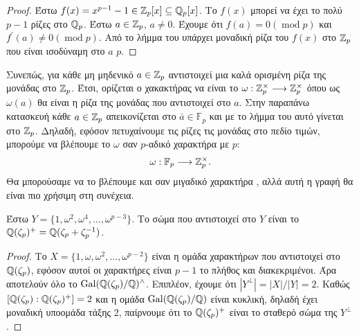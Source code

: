 \begin{proof}
	Έστω $f(x) = x^{p-1} -1 \in \mathbb{Z}_p[x] \subseteq \mathbb{Q}_p[x]$. Το $f(x)$ μπορεί να έχει το πολύ $p-1$ ρίζες στο $\mathbb{Q}_p$. Έστω $a \in \mathbb{Z}_p$, $a\neq 0$. 
	Έχουμε ότι $f(a) = 0 (\operatorname{mod} p)$ και $f^{\prime}(a) \neq 0(\operatorname{mod}p)$. Από το λήμμα του  υπάρχει μοναδική ρίζα του $f(x)$ στο $\mathbb{Z}_p$ που είναι ισοδύναμη στο $a$  $p$. 
\end{proof}


\noindent Συνεπώς, για κάθε μη μηδενικό $a\in\mathbb{Z}_p$ αντιστοιχεί μια καλά ορισμένη ρίζα της μονάδας στο $\mathbb{Z}_p$. Έτσι, ορίζεται ο χακακτήρας  
να είναι το $\omega:\mathbb{Z}_p^\times \longrightarrow \mathbb{Z}_p^\times$ όπου ως $\omega(a)$ θα είναι η ρίζα της μονάδας που αντιστοιχεί στο $a$. Στην παραπάνω 
κατασκευή κάθε $a\in \mathbb{Z}_p$ απεικονίζεται στο $\bar{a} \in \mathbb{F}_p$ και με το λήμμα του  αυτό γίνεται  στο $\mathbb{Z}_p$. Δηλαδή, εφόσον πετυχαίνουμε τις ρίζες τις μονάδας στο πεδίο τιμών, μπορούμε να βλέπουμε το $\omega$ σαν $p$-αδικό χαρακτήρα  με  $p$:
$$\omega: \mathbb{F}_p \longrightarrow \mathbb{Z}_p^\times .$$
Θα μπορούσαμε να το βλέπουμε και σαν μιγαδικό χαρακτήρα , αλλά αυτή η γραφή θα είναι πιο χρήσιμη στη συνέχεια.

\begin{prop} Έστω $Y = \{1,\omega^2,\omega^4,\ldots,\omega^{p-3}\}$. Το σώμα που αντιστοιχεί στο $Y$ είναι το $\mathbb{Q}(\zeta_p)^+ = \mathbb{Q}(\zeta_p + \zeta_p^{-1})$.
\end{prop}

\begin{proof}
	Το $X = \{1,\omega,\omega^2,\ldots,\omega^{p-2}\}$ είναι η ομάδα χαρακτήρων που αντιστοιχεί στο $\mathbb{Q}(\zeta_p)$, εφόσον αυτοί οι χαρακτήρες 
	είναι $p-1$ το πλήθος και διακεκριμένοι. Άρα αποτελούν όλο το $\operatorname{Gal}(\mathbb{Q}(\zeta_p)/\mathbb{Q})^{\wedge}$. Επιπλέον, έχουμε ότι $|Y^\perp| = |X|/|Y| = 2$. 
	Καθώς $[\mathbb{Q}(\zeta_p):\mathbb{Q}(\zeta_p)^+]=2$ και η ομάδα $\operatorname{Gal}(\mathbb{Q}(\zeta_p)/\mathbb{Q})$ είναι κυκλική, δηλαδή έχει μοναδική υποομάδα τάξης 2, παίρνουμε ότι 
	το $\mathbb{Q}(\zeta_p)^+$ είναι το σταθερό σώμα της $Y^\perp$. 
\end{proof}
